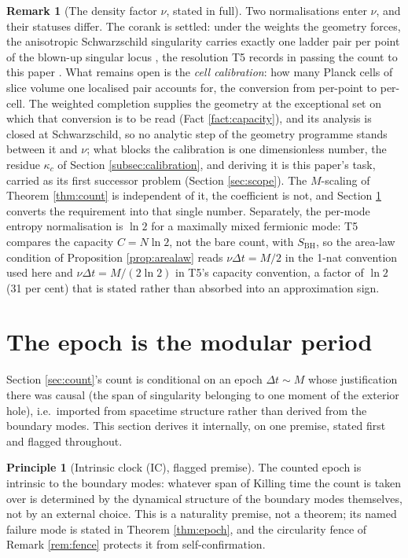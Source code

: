 \documentclass[11pt]{article}
\theoremstyle{definition}
\newtheorem{remark}[theorem]{Remark}
\newtheorem{principle}[theorem]{Principle}
\newcommand{\SBH}{S_{\mathrm{BH}}}
\begin{document}
\begin{remark}[The density factor $\nu$, stated in full]\label{rem:nu}
Two normalisations enter $\nu$, and their statuses differ. The corank is settled: under the weights the geometry forces, the anisotropic Schwarzschild singularity carries exactly one ladder pair per point of the blown-up singular locus \cite[\S 8.9]{ButlerT4}, the resolution T5 records in passing the count to this paper \cite[\S 10]{ButlerT5}. What remains open is the \emph{cell calibration}: how many Planck cells of slice volume one localised pair accounts for, the conversion from per-point to per-cell. The weighted completion supplies the geometry at the exceptional set on which that conversion is to be read (Fact \ref{fact:capacity}), and its analysis is closed at Schwarzschild, so no analytic step of the geometry programme stands between it and $\nu$; what blocks the calibration is one dimensionless number, the residue $\kappa_c$ of Section \ref{subsec:calibration}, and deriving it is this paper's task, carried as its first successor problem (Section \ref{sec:scope}). The $M$-scaling of Theorem \ref{thm:count} is independent of it, the coefficient is not, and Section \ref{sec:epoch} converts the requirement into that single number. Separately, the per-mode entropy normalisation is $\ln 2$ for a maximally mixed fermionic mode: T5 compares the capacity $C = N\ln 2$, not the bare count, with $\SBH$, so the area-law condition of Proposition \ref{prop:arealaw} reads $\nu\Delta t = M/2$ in the 1-nat convention used here and $\nu\Delta t = M/(2\ln 2)$ in T5's capacity convention, a factor of $\ln 2$ (31 per cent) that is stated rather than absorbed into an approximation sign.
\end{remark}

\section{The epoch is the modular period}\label{sec:epoch}

Section \ref{sec:count}'s count is conditional on an epoch $\Delta t \sim M$ whose justification there was causal (the span of singularity belonging to one moment of the exterior hole), i.e.\ imported from spacetime structure rather than derived from the boundary modes. This section derives it internally, on one premise, stated first and flagged throughout.

\begin{principle}[Intrinsic clock (IC), flagged premise]\label{prin:ic}
The counted epoch is intrinsic to the boundary modes: whatever span of Killing time the count is taken over is determined by the dynamical structure of the boundary modes themselves, not by an external choice. This is a naturality premise, not a theorem; its named failure mode is stated in Theorem \ref{thm:epoch}, and the circularity fence of Remark \ref{rem:fence} protects it from self-confirmation.
\end{principle}
\end{document}
